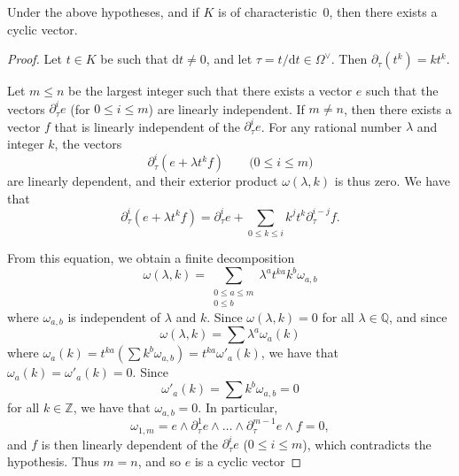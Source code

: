 \documentclass{report}
\theoremstyle{plain}
\newenvironment{lemma}[1]
    {\renewcommand\theinnercustomlemma{#1}\innercustomlemma}
    {\endinnercustomlemma}
\theoremstyle{definition}
\newcommand{\QQ}{\mathbb{Q}}
\newcommand{\ZZ}{\mathbb{Z}}
\newcommand{\dd}{\mathrm{d}}
\renewcommand{\leq}{\leqslant}
\newcommand{\oldpage}[1]{\marginpar{\footnotesize$\Big\vert$ \textit{p.~#1}}}
\begin{document}
\begin{lemma}{1.3}
\label{II.1.3}
  Under the above hypotheses, and if $K$ is of characteristic~$0$, then there exists a cyclic vector.
\end{lemma}

\begin{proof}
  Let $t\in K$ be such that $\dd t\neq0$, and let $\tau=t/\dd t\in\Omega^\vee$.
  Then $\partial_\tau(t^k)=kt^k$.

  Let $m\leq n$ be the largest integer such that there exists a vector $e$ such that the vectors $\partial_\tau^i e$ (for $0\leq i\leq m$) are linearly independent.
  If $m\neq n$, then there exists a vector $f$ that is linearly independent of the $\partial_\tau^i e$.
  For any rational number $\lambda$ and integer $k$, the vectors
  \[
    \partial_\tau^i(e+\lambda t^k f)
    \qquad\mbox{($0\leq i\leq m$)}
  \]
  are linearly dependent, and their exterior product $\omega(\lambda,k)$ is thus zero.
  We have that
  \[
    \partial_\tau^i(e+\lambda t^k f)
    = \partial_\tau^i e + \sum_{0\leq k\leq i} k^j t^k \partial_\tau^{i-j} f.
  \]

  From this equation, we obtain a finite decomposition
  \[
    \omega(\lambda,k)
    = \sum_{\substack{0\leq a\leq m\\0\leq b}} \lambda^a t^{ka} k^b \omega_{a,b}
  \]
\oldpage{43}
  where $\omega_{a,b}$ is independent of $\lambda$ and $k$.
  Since $\omega(\lambda,k)=0$ for all $\lambda\in\QQ$, and since
  \[
    \omega(\lambda,k) = \sum \lambda^a \omega_a(k)
  \]
  where $\omega_a(k) = t^{ka}(\sum k^b \omega_{a,b}) = t^{ka} \omega'_a(k)$, we have that $\omega_a(k) = \omega'_a(k) = 0$.
  Since
  \[
    \omega'_a(k) = \sum k^b \omega_{a,b} = 0
  \]
  for all $k\in\ZZ$, we have that $\omega_{a,b}=0$.
  In particular,
  \[
    \omega_{1,m}
    = e\wedge\partial_\tau^1 e\wedge\ldots\wedge\partial_\tau^{m-1} e\wedge f
    = 0,
  \]
  and $f$ is then linearly dependent of the $\partial_\tau^i e$ ($0\leq i\leq m$), which contradicts the hypothesis.
  Thus $m=n$, and so $e$ is a cyclic vector
\end{proof}
\end{document}
